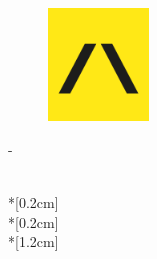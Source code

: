 \thispagestyle{empty}             %
\calccentering{\unitlength}
\begin{figure}[h!]
    \hfill\includegraphics[height=3cm]{graphics/Pleno_logo.png}
\end{figure}
\begin{adjustwidth*}{\unitlength}{-\unitlength}
    \begin{adjustwidth}{-0.5cm}{-0.5cm}
        \sffamily
        \begin{flushright}
        \end{flushright}
        \vspace*{\fill}
        \noindent
        \HUGE \thesistitle{}\\*[0.2cm]
        \Huge \thesissubtitle{}\\*[0.2cm]
        \Huge \version{}\\*[1.2cm]
        \parbox[b]{\linewidth}{%
            \LARGE 
            \normalsize
            \thesislocation{} \the\year
        }
    \end{adjustwidth}
\end{adjustwidth*}
\normalfont
\normalsize

